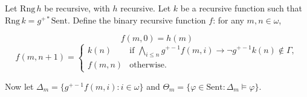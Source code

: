 Let $\text{Rng}\,h$ be recursive, with $h$ recursive. Let $k$ be a recursive function such that $\text{Rng}\,k = g^{+*} \text{Sent}$. Define the binary recursive function $f$: for any $m, n \in \omega$,

$$f(m, 0) = h(m)$$
$$f(m, n + 1) = \begin{cases}
k(n) & \text{if } \bigwedge_{i \leq n} g^{+-1} f(m, i) \rightarrow \neg g^{+-1} k(n) \notin \Gamma, \\
f(m, n) & \text{otherwise.}
\end{cases}$$

Now let $\Delta_m = \{g^{+-1} f(m, i) : i \in \omega\}$ and $\Theta_m = \{\varphi \in \text{Sent} : \Delta_m \models \varphi\}$.
